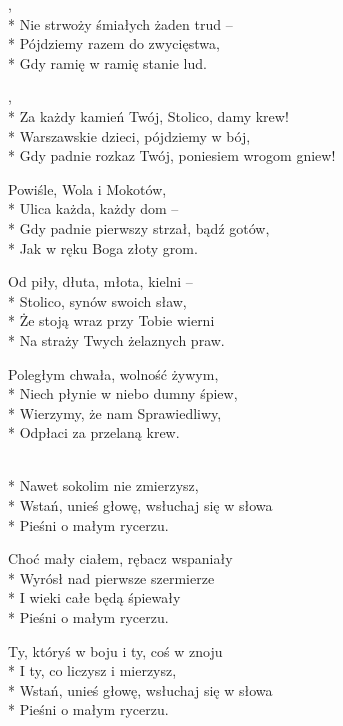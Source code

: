 \begin{lyrics}[longestline={Gdy padnie rozkaz Twój, poniesiem wrogom gniew!}]

,\\*
Nie strwoży śmiałych żaden trud --\\*
Pójdziemy razem do zwycięstwa,\\*
Gdy ramię w ramię stanie lud.

\begin{chorus}
,\\*
Za każdy kamień Twój, Stolico, damy krew!\\*
Warszawskie dzieci, pójdziemy w bój,\\*
Gdy padnie rozkaz Twój, poniesiem wrogom gniew!
\end{chorus}

Powiśle, Wola i Mokotów,\\*
Ulica każda, każdy dom --\\*
Gdy padnie pierwszy strzał, bądź gotów,\\*
Jak w ręku Boga złoty grom.

\chorusref

Od piły, dłuta, młota, kielni --\\*
Stolico, synów swoich sław,\\*
Że stoją wraz przy Tobie wierni\\*
Na straży Twych żelaznych praw.

\chorusref

Poległym chwała, wolność żywym,\\*
Niech płynie w niebo dumny śpiew,\\*
Wierzymy, że nam Sprawiedliwy,\\*
Odpłaci za przelaną krew.

\chorusref
\end{lyrics}




\begin{lyrics}[longestline={Wstań, unieś głowę, wsłuchaj się w słowa}]

\\*
Nawet sokolim nie zmierzysz,\\*
Wstań, unieś głowę, wsłuchaj się w słowa\\*
Pieśni o małym rycerzu.

Choć mały ciałem, rębacz wspaniały\\*
Wyrósł nad pierwsze szermierze\\*
I wieki całe będą śpiewały\\*
Pieśni o małym rycerzu.

Ty, któryś w boju i ty, coś w znoju\\*
I ty, co liczysz i mierzysz,\\*
Wstań, unieś głowę, wsłuchaj się w słowa\\*
Pieśni o małym rycerzu.
\end{lyrics}



